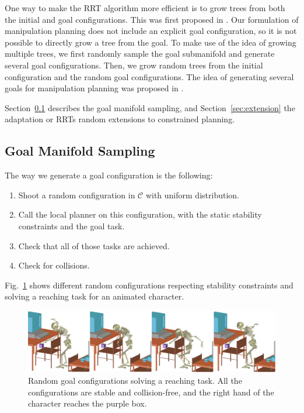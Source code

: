 \documentclass{article}
\begin{document}
One way to make the RRT algorithm more efficient is to grow trees from both the initial
and  goal configurations. This was first proposed in 
\cite{kuffner00rrtconnect}. Our formulation of manipulation planning does
not include an explicit goal configuration, so it is not possible to directly grow
a tree from the goal. To make use of the idea of growing multiple trees, we first
randomly sample the goal submanifold and generate several goal configurations. Then, 
we grow random
trees from the initial configuration and the random goal configurations. The idea of
generating several goals for manipulation planning was proposed in \cite{diankov2008bpc}.

Section~\ref{sec:goal-sampling}  describes the goal manifold sampling, and 
Section~\ref{sec:extension} the adaptation or RRTs random extensions to constrained planning.

\subsection{Goal Manifold Sampling}
\label{sec:goal-sampling}

The way we generate a goal configuration is the following:
\begin{enumerate}
\item Shoot a random configuration in $\mathcal{C}$ with uniform distribution.
\item Call the local planner on this configuration, with the static
  stability constraints and the goal task.
\item Check that all of those tasks are achieved.
\item Check for collisions.
\end{enumerate}

Fig.~\ref{fig:goal} shows different random configurations respecting stability 
constraints and solving a reaching task for an animated character. 

\begin{figure}[h]
\centering
\includegraphics[width=\linewidth]{pics/goal.png}

\caption{Random goal configurations solving a reaching task. All the
  configurations are stable and collision-free, and the right hand of the character
  reaches the purple box.}
\label{fig:goal}
\end{figure}
\end{document}
